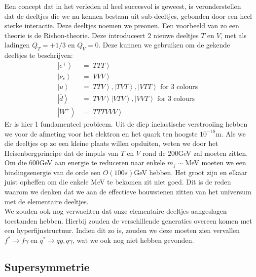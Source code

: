\documentclass[../main.tex]{subfiles}
\begin{document}
Een concept dat in het verleden al heel succesvol is geweest, is veronderstellen dat de deeltjes die we nu kennen bestaan uit sub-deeltjes, gebonden door een heel sterke interactie. Deze deeltjes noemen we preonen. Een voorbeeld van zo een theorie is de Rishon-theorie. Deze introduceert 2 nieuwe deeltjes $T$ en $V$, met als ladingen $Q_{T}=+1 / 3$ en $Q_{V}=0$. Deze kunnen we gebruiken om de gekende deeltjes te beschrijven:
\begin{equation}
    \begin{aligned}
        \label{eq:rischon_samenstelling}
        \left| e^{+}\right>&=\left| T T T\right>\\
        \left| \nu_{e}\right>&=\left| V V V\right>\\
        \left|u\right> &=\left|T T V\right>,\left| T V T\right>, \left| V T T\right>\text { for } 3 \text { colours } \\
        \left| \bar{d}\right>&=\left|T V V\right>\left| V T V\right>, \left| V V T\right>\text { for } 3 \text { colours } \\
        \left|W^{+}\right\rangle &=\left| T T T V V V\right>
    \end{aligned}
\end{equation}
Er is hier 1 fundamenteel probleem. Uit de diep inelastische verstrooiing hebben we voor de afmeting voor het elektron en het quark ten hoogste $10^{-18}$m. Als we die deeltjes op zo een kleine plaats willen opsluiten, weten we door het Heisenbergprincipe dat de impuls van $T$ en $V$ rond de 200GeV zal moeten zitten. Om die 600GeV aan energie te reduceren naar enkele $m_f\sim$MeV moeten we een bindingsenergie van de orde een $O(100s)$GeV hebben. Het groot zijn en elkaar juist opheffen om die enkele MeV te bekomen zit niet goed. Dit is de reden waarom we denken dat we aan de effectieve bouwstenen zitten van het universum met de elementaire deeltjes.\\
We zouden ook nog verwachten dat onze elementaire deeltjes aangeslagen toestanden hebben. Hierbij zouden de verschillende generaties overeen komen met een hyperfijnstructuur. Indien dit zo is, zouden we deze moeten zien vervallen $f^{*} \rightarrow f \gamma$ en $q^{*} \rightarrow q g, q \gamma$, wat we ook nog niet hebben gevonden.

\subsection{Supersymmetrie}%
\label{sub:supersymmetrie}
\end{document}
